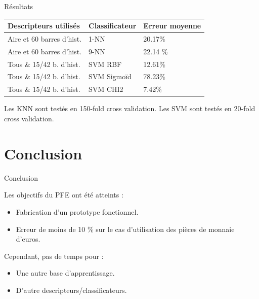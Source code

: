 \documentclass{beamer}
\begin{document}
\begin{frame}{Résultats}
 \begin{table}[]
\centering
\begin{tabular}{lll}
\textbf{Descripteurs utilisés}                                                   & \textbf{Classificateur} & \textbf{Erreur moyenne} \\ \hline
Aire et 60 barres d'hist.                                               & 1-NN           & 20.17\%                 \\ \hline
Aire et 60 barres d'hist.                                                & 9-NN           & 22.14 \%                \\ \hline
Tous \& 15/42 b. d'hist. & SVM RBF         & 12.61\%                 \\ \hline
Tous \& 15/42 b. d'hist. & SVM Sigmoïd     & 78.23\%                 \\ \hline
Tous \& 15/42 b. d'hist. & SVM CHI2       & 7.42\%                 
\end{tabular}
\end{table}

Les KNN sont testés en 150-fold cross validation.
Les SVM sont testés en 20-fold cross validation.
\end{frame}

\section*{Conclusion}

\begin{frame}{Conclusion}

Les objectifs du PFE ont été atteints :
\begin{itemize}
    \item Fabrication d'un \alert{prototype fonctionnel}.
    \item Erreur de \alert{moins de 10 \%} sur le cas d'utilisation des pièces de monnaie d'euros.
\end{itemize}
Cependant, pas de temps pour :
\begin{itemize}
    \item Une autre base d'apprentissage.
    \item D'autre descripteurs/classificateurs.
\end{itemize}
\end{frame}
\end{document}
